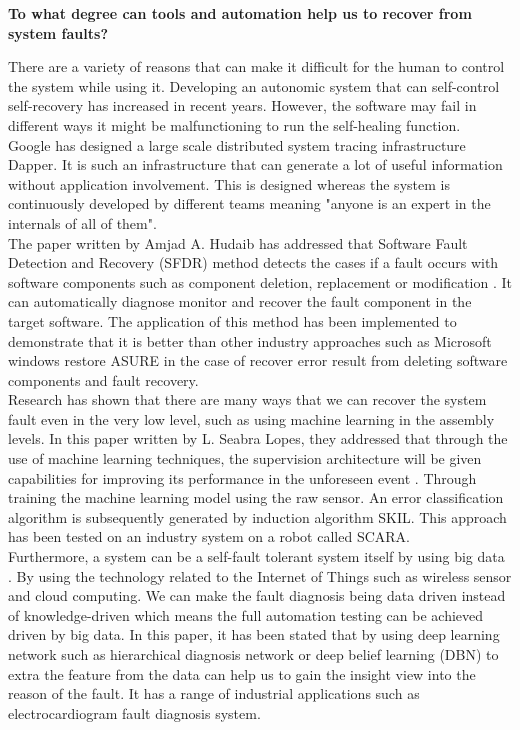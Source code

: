 \documentclass[12pt]{article}
\begin{document}
\pagestyle{empty}

{\bf To what degree can tools and automation help us to recover from system faults?}

There are a variety of reasons that can make it difficult for the human to control the system while using it. Developing an autonomic system that can self-control self-recovery has increased in recent years. However, the software may fail in different ways it might be malfunctioning to run the self-healing function. \\[10px]
Google has designed a large scale distributed system tracing infrastructure Dapper. It is such an infrastructure that can generate a lot of useful information without application involvement. This is designed whereas the system is continuously developed by different teams meaning "anyone is an expert in the internals of all of them"\cite{ct4}.\\[10px]
The paper written by Amjad A. Hudaib has addressed that Software Fault Detection and Recovery (SFDR) method detects the cases if a fault occurs with software components such as component deletion, replacement or modification \cite{ct2}. It can automatically diagnose monitor and recover the fault component in the target software. The application of this method has been implemented to demonstrate that it is better than other industry approaches such as Microsoft windows restore ASURE in the case of recover error result from deleting software components and fault recovery.\\[10px]
Research has shown that there are many ways that we can recover the system fault even in the very low level, such as using machine learning in the assembly levels. In this paper written by L. Seabra Lopes, they addressed that through the use of machine learning techniques, the supervision architecture will be given capabilities for improving its performance in the unforeseen event \cite{ct1}. Through training the machine learning model using the raw sensor. An error classification algorithm is subsequently generated by induction algorithm SKIL. This approach has been tested on an industry system on a robot called SCARA.\\[10px]
Furthermore, a system can be a self-fault tolerant system itself by using big data \cite{ct3}. By using the technology related to the Internet of Things such as wireless sensor and cloud computing. We can make the fault diagnosis being data driven instead of knowledge-driven which means the full automation testing can be achieved driven by big data. In this paper, it has been stated that by using deep learning network such as hierarchical diagnosis network or deep belief learning (DBN) to extra the feature from the data can help us to gain the insight view into the reason of the fault. It has a range of industrial applications such as electrocardiogram fault diagnosis system. 
\end{document}
